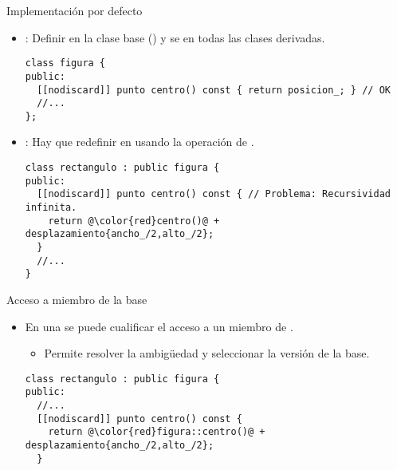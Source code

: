 \begin{frame}[t,fragile]{Implementación por defecto}
\begin{itemize}
  \item {}: Definir  
        en la clase base ()
        y se  en todas las clases derivadas.
\begin{lstlisting} 
class figura {
public:
  [[nodiscard]] punto centro() const { return posicion_; } // OK
  //...
};
\end{lstlisting}

  \item {}: Hay que redefinir 
        en  usando la operación  de .
\begin{lstlisting}[escapechar=@]
class rectangulo : public figura {
public:
  [[nodiscard]] punto centro() const { // Problema: Recursividad infinita.
    return @\color{red}centro()@ + desplazamiento{ancho_/2,alto_/2};
  }
  //...
}
\end{lstlisting}

\end{itemize}
\end{frame}

\begin{frame}[t,fragile]{Acceso a miembro de la base}
\begin{itemize}
  \item En una 
        se puede cualificar el acceso a un miembro de .
    \begin{itemize}
      \item Permite resolver la ambigüedad y seleccionar la versión de la base.
    \end{itemize}
\begin{lstlisting}[escapechar=@]
class rectangulo : public figura {
public:
  //...
  [[nodiscard]] punto centro() const {
    return @\color{red}figura::centro()@ + desplazamiento{ancho_/2,alto_/2};
  }
\end{lstlisting}
\end{itemize}
\end{frame}
